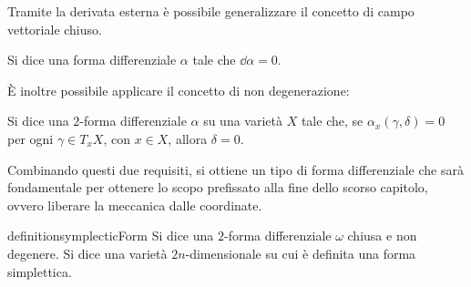 Tramite la derivata esterna è possibile generalizzare il concetto di campo vettoriale chiuso.
\begin{definition}
  Si dice  una forma differenziale $\alpha$ tale che $\dd \alpha = 0$. 
\end{definition}

È inoltre possibile applicare il concetto di non degenerazione:
\begin{definition}
  Si dice  una $2$-forma differenziale $\alpha$ su una varietà $X$ tale che, se $\alpha_x (\gamma, \delta) = 0$ per ogni $\gamma \in T_x X$, con $x \in  X$, allora $\delta = 0$.
\end{definition}

Combinando questi due requisiti, si ottiene un tipo di forma differenziale che sarà fondamentale per ottenere lo scopo prefissato alla fine dello scorso capitolo, ovvero liberare la meccanica dalle coordinate.
\begin{restatable}{definition}{symplecticForm}
  Si dice  una $2$-forma differenziale $\omega$ chiusa e non degenere. Si dice  una varietà $2n$-dimensionale su cui è definita una forma simplettica.
\end{restatable}